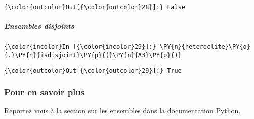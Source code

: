 \begin{Verbatim}[commandchars=\\\{\}]
{\color{outcolor}Out[{\color{outcolor}28}]:} False
\end{Verbatim}
            
    \hypertarget{ensembles-disjoints}{%
\subparagraph{Ensembles disjoints}\label{ensembles-disjoints}}

    \begin{Verbatim}[commandchars=\\\{\}]
{\color{incolor}In [{\color{incolor}29}]:} \PY{n}{heteroclite}\PY{o}{.}\PY{n}{isdisjoint}\PY{p}{(}\PY{n}{A3}\PY{p}{)}
\end{Verbatim}


\begin{Verbatim}[commandchars=\\\{\}]
{\color{outcolor}Out[{\color{outcolor}29}]:} True
\end{Verbatim}
            
    \hypertarget{pour-en-savoir-plus}{%
\subsubsection{Pour en savoir plus}\label{pour-en-savoir-plus}}

    Reportez vous à
\href{https://docs.python.org/3/library/stdtypes.html\#set-types-set-frozenset}{la
section sur les ensembles} dans la documentation Python.


    
    
    

